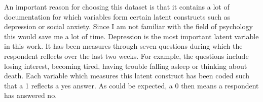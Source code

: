 \documentclass[11pt]{article}
\begin{document}
An important reason for choosing this dataset is that it contains a lot of documentation for which variables form certain latent constructs such as depression or social anxiety.
Since I am not familiar with the field of psychology this would save me a lot of time.
Depression is the most important latent variable in this work.
It has been measures through seven questions during which the respondent reflects over the last two weeks.
For example, the questions include losing interest, becoming tired, having trouble falling asleep or thinking about death.
Each variable which measures this latent construct has been coded such that a 1 reflects a yes answer.
As could be expected, a 0 then means a respondent has answered no.

\begin{table}[h!]
\end{table}
\end{document}
